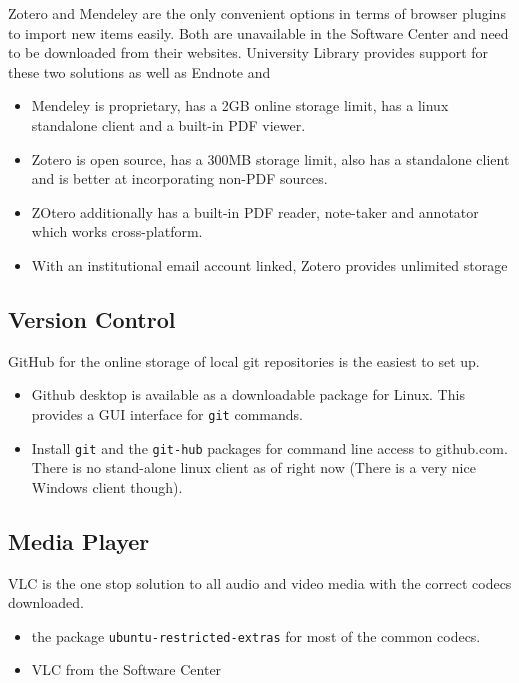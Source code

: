 \documentclass[8pt,letterpaper,twocolumn]{article}
\begin{document}
Zotero and Mendeley are the only convenient options in terms of browser plugins to import new items easily. Both are unavailable in the Software Center and need to be downloaded from their websites. University Library provides support for these two solutions as well as Endnote and 

\begin{itemize}
	\item Mendeley is proprietary, has a 2GB online storage limit, has a linux standalone client and a built-in PDF viewer.
	\item Zotero is open source, has a 300MB storage limit, also has a standalone client and is better at incorporating non-PDF sources.
	\item ZOtero additionally has a built-in PDF reader, note-taker and annotator which works cross-platform.
	\item With an institutional email account linked, Zotero provides unlimited storage
\end{itemize}


\subsection{Version Control}

GitHub for the online storage of local git repositories is the easiest to set up.

\begin{itemize}
	\item Github desktop is available as a downloadable package for Linux. This provides a GUI interface for \texttt{git} commands.
	\item Install \texttt{git} and the \texttt{git-hub} packages for command line access to github.com. There is no stand-alone linux client as of right now (There is a very nice Windows client though).
\end{itemize}

\subsection{Media Player}

VLC is the one stop solution to all audio and video media with the correct codecs downloaded.

\begin{itemize}
	\item the package \texttt{ubuntu-restricted-extras} for most of the common codecs.
	\item VLC from the Software Center
\end{itemize}
\end{document}
